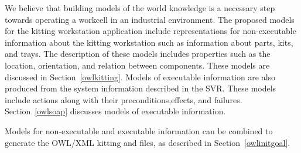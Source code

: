 We believe that building models of the world knowledge is a necessary step towards 
operating a workcell in an industrial environment. The proposed models 
for the kitting workstation application include 
representations for non-executable information about the kitting workstation 
such as information about parts, kits, and trays. The description of these 
models includes properties such as the location, orientation, and relation 
between components. These models are discussed in Section~\ref{owlkitting}. 
Models of executable information are also produced from the system 
information described in the SVR. These models include actions along 
with their preconditions,effects, and failures. 
Section~\ref{owlsoap} discusses models of executable information.

Models for non-executable and executable information can be 
combined to generate the OWL/XML kitting  and  
files, as described in Section~\ref{owlinitgoal}.

